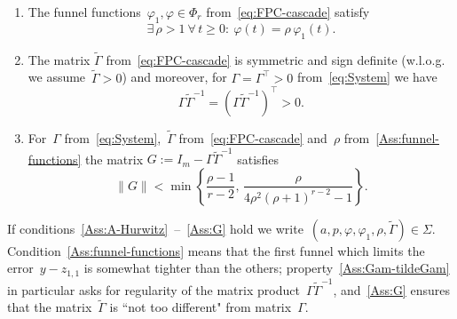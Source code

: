 \documentclass[ envcountsect, envcountsame]{svjour3}
\newtheorem{Assumption}{Assumption}
\newcommand{\vp}{\varphi}
\begin{document}
\begin{enumerate}[label = \textbf{(A.\arabic{enumi})}, ref=(A.\arabic{enumi}),leftmargin=*]
%
\item \label{Ass:funnel-functions}
The funnel functions~$\vp_1, \vp \in \Phi_r$ from~\eqref{eq:FPC-cascade} satisfy
\begin{equation*}
\exists \, \rho >1 \ \forall\, t\ge0: \  \vp(t) = \rho \, \vp_1(t).
\end{equation*}
%
\item \label{Ass:Gam-tildeGam}
The matrix $\tilde \Gamma$ from~\eqref{eq:FPC-cascade} is symmetric and sign definite (w.l.o.g. we assume~$\tilde \Gamma > 0$) and moreover, for $\Gamma = \Gamma^\top > 0$ from~\eqref{eq:System} we have 
\begin{equation*}
{\Gamma \tilde \Gamma^{-1} = \left(\Gamma \tilde \Gamma^{-1} \right)^\top > 0}. 
\end{equation*}
%
\item  \label{Ass:G}
For~$\Gamma$ from~\eqref{eq:System},~$\tilde \Gamma$ from~\eqref{eq:FPC-cascade} and~$\rho$ from~\ref{Ass:funnel-functions} the matrix $G := I_m - \Gamma \tilde \Gamma^{-1}$ satisfies
\begin{equation*} 
\|G\| < \min \left\{\frac{\rho - 1}{r-2} , \, \frac{\rho}{4\rho^2 (\rho+1)^{r-2} -1} \right\} .
\end{equation*}
\end{enumerate}
%
If conditions~\ref{Ass:A-Hurwitz}~--~\ref{Ass:G} hold we write~$(a,p,\vp,\vp_1,\rho,\tilde \Gamma) \in \Sigma$.
%
Condition~\ref{Ass:funnel-functions} means that the first funnel which limits the error~$y-z_{1,1}$ is somewhat tighter than the others; property~\ref{Ass:Gam-tildeGam} in particular asks for regularity of the matrix product~$\Gamma \tilde \Gamma^{-1}$, and~\ref{Ass:G} ensures that the matrix~$\tilde \Gamma$ is ``not too different" from matrix~$\Gamma$.
%
\end{document}
